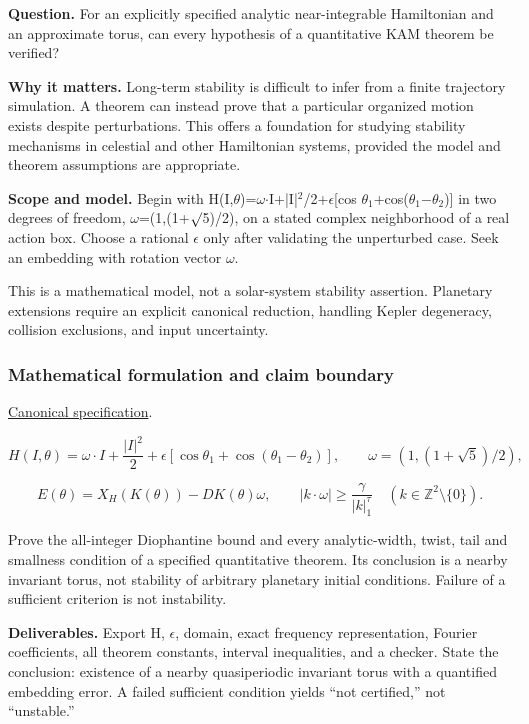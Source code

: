 \documentclass[
  11pt,
]{article}
\begin{document}
\textbf{Question.} For an explicitly specified analytic near-integrable
Hamiltonian and an approximate torus, can every hypothesis of a
quantitative KAM theorem be verified?

\textbf{Why it matters.} Long-term stability is difficult to infer from
a finite trajectory simulation. A theorem can instead prove that a
particular organized motion exists despite perturbations. This offers a
foundation for studying stability mechanisms in celestial and other
Hamiltonian systems, provided the model and theorem assumptions are
appropriate.

\textbf{Scope and model.} Begin with
H(I,\ensuremath{\theta})=\ensuremath{\omega}\ensuremath{\cdot}I+|I|\ensuremath{{}^{2}}/2+\ensuremath{\epsilon}[cos
\ensuremath{\theta}\ensuremath{{}_{1}}+cos(\ensuremath{\theta}\ensuremath{{}_{1}}\ensuremath{-}\ensuremath{\theta}\ensuremath{{}_{2}})]
in two degrees of freedom,
\ensuremath{\omega}=(1,(1+\ensuremath{\surd}5)/2), on a stated complex
neighborhood of a real action box. Choose a rational
\ensuremath{\epsilon} only after validating the unperturbed case. Seek
an embedding with rotation vector \ensuremath{\omega}.

This is a mathematical model, not a solar-system stability assertion.
Planetary extensions require an explicit canonical reduction, handling
Kepler degeneracy, collision exclusions, and input uncertainty.

\subsubsection{Mathematical formulation and claim boundary}

\href{https://github.com/rick-stevens-ai/Pure-Thought/blob/main/PRDs/26-KAM-Theory-Planetary-Stability.md}{Canonical
specification}.

\[H(I,\theta)=\omega\cdot I+\frac{|I|^2}{2}
+\epsilon[\cos\theta_1+\cos(\theta_1-\theta_2)],
\qquad\omega=(1,(1+\sqrt5)/2),\]

\[E(\theta)=X_H(K(\theta))-DK(\theta)\omega,
\qquad |k\cdot\omega|\ge\frac\gamma{|k|_1^\tau}
\quad(k\in\mathbb Z^2\setminus\{0\}).\]

Prove the all-integer Diophantine bound and every analytic-width, twist,
tail and smallness condition of a specified quantitative theorem. Its
conclusion is a nearby invariant torus, not stability of arbitrary
planetary initial conditions. Failure of a sufficient criterion is not
instability.

\textbf{Deliverables.} Export H, \ensuremath{\epsilon}, domain, exact
frequency representation, Fourier coefficients, all theorem constants,
interval inequalities, and a checker. State the conclusion: existence of
a nearby quasiperiodic invariant torus with a quantified embedding
error. A failed sufficient condition yields ``not certified,'' not
``unstable.''
\end{document}
